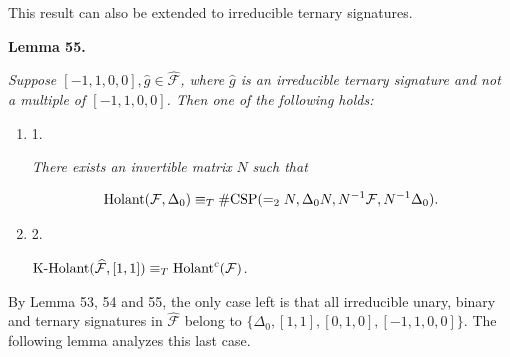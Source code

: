 


This result can also be extended to irreducible ternary signatures.\par





\par\medskip\noindent\textbf{
\textbf{Lemma 55}\textbf{.}
}\par



\emph{Suppose $[-1,1,0,0],\widehat{g}\in\widehat{\mathcal{F}}$, where $\widehat{g}$ is an irreducible ternary signature and not a multiple of $[-1,1,0,0]$. Then one of the following holds:}\par


\begin{enumerate}


\item[] 
1. 


\emph{There exists an invertible matrix }$N$\emph{ such that}\par


\[\begin{gathered}
\textup{{Holant}}(\mathcal{F},\Delta_{0})\equiv_{T}\textup{{\#CSP}}(=_{2}N,\Delta_{0}N,N^{-1}\mathcal{F},N^{-1}\Delta_{0}).
\end{gathered}\]





\item[] 
2. 


$\textup{{K-Holant}}(\widehat{\mathcal{F}},[1,1])\equiv_{T}\textup{{Holant}}^{c}(\mathcal{F})$\emph{.}\par





\end{enumerate}






By Lemma 53, 54 and 55, the only case left is that all irreducible unary, binary and ternary signatures in $\widehat{\mathcal{F}}$ belong to $\{\Delta_{0},[1,1],[0,1,0],[-1,1,0,0]\}$. The following lemma analyzes this last case.\par





